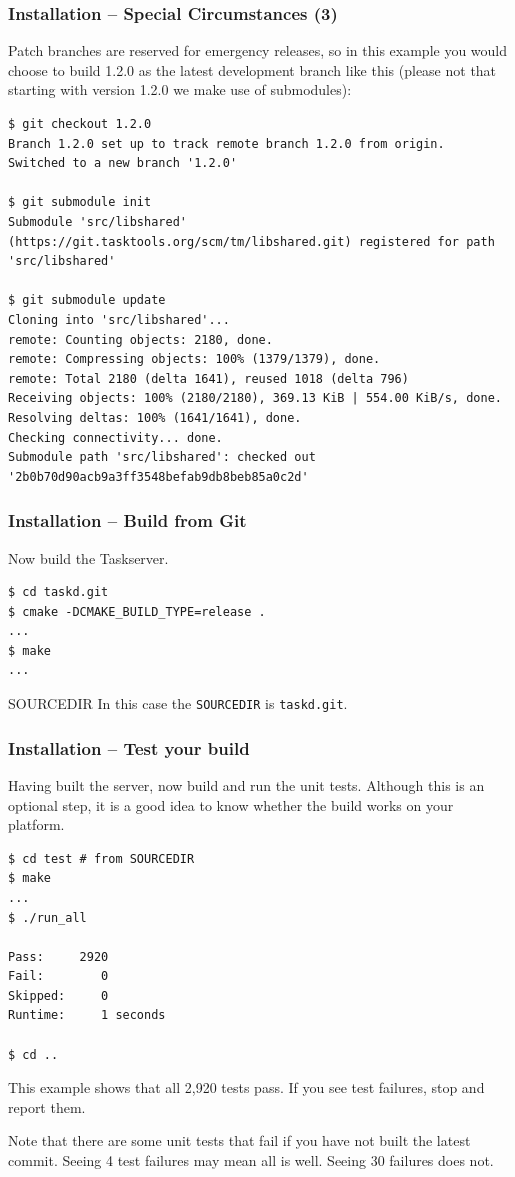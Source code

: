 \documentclass[t,handout]{beamer}
\begin{document}
\begin{frame}[fragile]\frametitle{Installation -- Special Circumstances (3)}
    \vfill
    Patch branches are reserved for emergency releases, so in this example you would choose to build 1.2.0 as the latest development branch like this (please not that starting with version 1.2.0 we make use of submodules):

    \begin{lstlisting}
$ git checkout 1.2.0
Branch 1.2.0 set up to track remote branch 1.2.0 from origin.
Switched to a new branch '1.2.0'

$ git submodule init
Submodule 'src/libshared' (https://git.tasktools.org/scm/tm/libshared.git) registered for path 'src/libshared'

$ git submodule update
Cloning into 'src/libshared'...
remote: Counting objects: 2180, done.
remote: Compressing objects: 100% (1379/1379), done.
remote: Total 2180 (delta 1641), reused 1018 (delta 796)
Receiving objects: 100% (2180/2180), 369.13 KiB | 554.00 KiB/s, done.
Resolving deltas: 100% (1641/1641), done.
Checking connectivity... done.
Submodule path 'src/libshared': checked out '2b0b70d90acb9a3ff3548befab9db8beb85a0c2d'\end{lstlisting}

\end{frame}

\begin{frame}[fragile]\frametitle{Installation -- Build from Git}\label{buildgit}
    \vfill
    Now build the Taskserver.

    \begin{lstlisting}
$ cd taskd.git
$ cmake -DCMAKE_BUILD_TYPE=release .
...
$ make
...\end{lstlisting}

    \begin{alertblock}{SOURCEDIR}
        In this case the \verb=SOURCEDIR= is \verb=taskd.git=.
    \end{alertblock}
\end{frame}

\begin{frame}[fragile]\frametitle{Installation -- Test your build}\label{buildtest}
    \vfill
    Having built the server, now build and run the unit tests. Although this is an optional step, it is a good idea to know whether the build works on your platform.

    \begin{lstlisting}
$ cd test # from SOURCEDIR
$ make
...
$ ./run_all

Pass:     2920
Fail:        0
Skipped:     0
Runtime:     1 seconds

$ cd ..\end{lstlisting}

    This example shows that all 2,920 tests pass.  If you see test failures, stop and report them.

    Note that there are some unit tests that fail if you have not built the latest commit. Seeing 4 test failures may mean all is well. Seeing 30 failures does not.
\end{frame}
\end{document}
